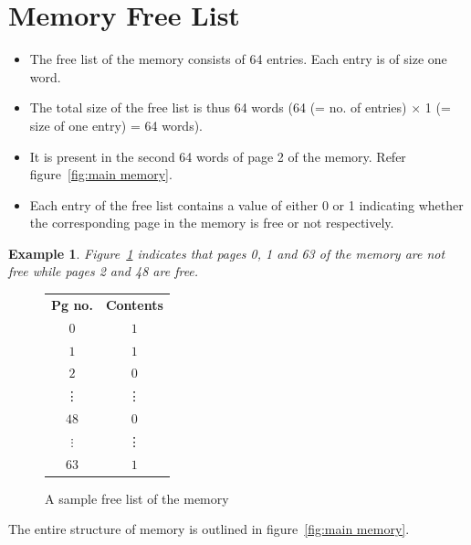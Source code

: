 \documentclass[11pt]{report}
\newtheorem{example}{Example}[section]
\begin{document}
\section{Memory Free List}
\label{lbl:memlst}

\begin{itemize}
	\item The free list of the memory consists of 64 entries. Each entry is of size one word.
	\item The total size of the free list is thus 64 words (64 (= no. of entries) $\times$ 1 (= size of one entry) = 64 words).
	\item It is present in the second 64 words of page 2 of the memory. Refer figure~\ref{fig:main memory}.
	\item Each entry of the free list contains a value of either 0 or 1 indicating whether the corresponding page in the memory is free or not respectively.
\end{itemize}

\begin{example} 
	Figure~\ref{fig:mem_free_list} indicates that pages 0, 1 and 63 of the memory are not free while pages 2 and 48 are free.
\end{example}

\begin{figure}[htp!] \small
	\centering
	\begin{tabular}{c|c|}
		\textbf{Pg no.} & \textbf{Contents} \\ \cline{2-2}
		$0$ & $1$ \\ \cline{2-2}
		$1$ & $1$ \\ \cline{2-2}
		$2$ & $0$ \\ \cline{2-2}
		\vdots & \vdots \\ \cline{2-2}
		$48$ & $0$ \\ \cline{2-2}
		$\vdots$ & \vdots \\ \cline{2-2}
		$63$ & $1$ \\ \cline{2-2}
	\end{tabular}
	\caption{A sample free list of the memory}
	\label{fig:mem_free_list}
\end{figure}

The entire structure of memory is outlined in figure~\ref{fig:main memory}.
\end{document}
